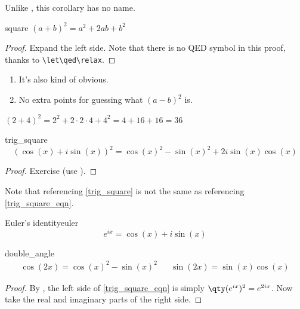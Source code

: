 \documentclass{article}
\begin{document}
\begin{corollary}{}{}
Unlike , this corollary has no name.
\end{corollary}

\begin{lemma}{}{square}
$(a+b)^2=a^2+2ab+b^2$
\end{lemma}
\begin{proof}\let\qed\relax
Expand the left side. Note that there is no QED symbol in this proof, thanks to \verb!\let\qed\relax!.
\end{proof}
\begin{remarks}\leavevmode %
\begin{enumerate}
    \item It's also kind of obvious.
    \item No extra points for guessing what $(a-b)^2$ is.
\end{enumerate}
\end{remarks}

\begin{example}
$(2+4)^2=2^2+2\cdot 2\cdot 4+4^2=4+16+16=36$
\end{example}

\begin{proposition}{}{trig_square}
\begin{equation}\label{trig_square_eqn}
    (\cos(x)+i\sin(x))^2=\cos(x)^2-\sin(x)^2+2i\sin(x)\cos(x)
\end{equation}
\end{proposition}
\begin{proof}
Exercise (use ).
\end{proof}

Note that referencing \cref{trig_square} is not the same as referencing \eqref{trig_square_eqn}.

\begin{lemma}{Euler's identity}{euler}
\begin{equation*}
    e^{ix}=\cos(x)+i\sin(x)
\end{equation*}
\end{lemma}

\begin{theorem}{}{double_angle}
\begin{align}
    \cos(2x)=\cos(x)^2-\sin(x)^2 && \sin(2x)=\sin(x)\cos(x)
\end{align}
\end{theorem}
\begin{proof}
By , the left side of \eqref{trig_square_eqn} is simply $\qty(e^{ix})^2=e^{2ix}$. Now take the real and imaginary parts of the right side.
\end{proof}
\end{document}
